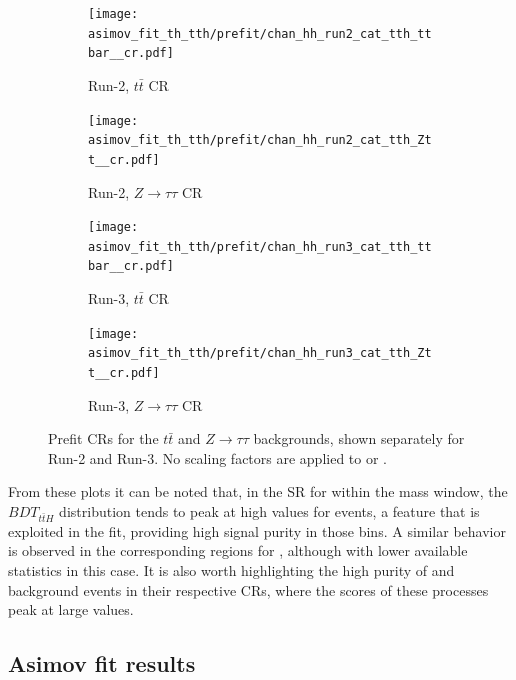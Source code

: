 \begin{figure}[htbp]
  \centering
  \begin{subfigure}[t]{0.45\textwidth}
    \centering
    \texttt{[image: asimov\_fit\_th\_tth/prefit/chan\_hh\_run2\_cat\_tth\_ttbar\_\_cr.pdf]}
    \caption{Run-2, $t\bar{t}$ CR}
  \end{subfigure}
  \hfill
  \begin{subfigure}[t]{0.45\textwidth}
    \centering
    \texttt{[image: asimov\_fit\_th\_tth/prefit/chan\_hh\_run2\_cat\_tth\_Ztt\_\_cr.pdf]}
    \caption{Run-2, $Z\to\tau\tau$ CR}
  \end{subfigure}

  \vspace{0.4cm}
  \begin{subfigure}[t]{0.45\textwidth}
    \centering
    \texttt{[image: asimov\_fit\_th\_tth/prefit/chan\_hh\_run3\_cat\_tth\_ttbar\_\_cr.pdf]}
    \caption{Run-3, $t\bar{t}$ CR}
  \end{subfigure}
  \hfill
  \begin{subfigure}[t]{0.45\textwidth}
    \centering
    \texttt{[image: asimov\_fit\_th\_tth/prefit/chan\_hh\_run3\_cat\_tth\_Ztt\_\_cr.pdf]}
    \caption{Run-3, $Z\to\tau\tau$ CR}
  \end{subfigure}

  \caption{Prefit CRs for the $t\bar{t}$ and $Z\to\tau\tau$ backgrounds, shown separately for Run-2 and Run-3. No scaling factors are applied to \ztautau or \ttbar.}
  \label{fig:crs}
\end{figure}
From these plots it can be noted that, in the SR for \ttH within the mass window, the $BDT_{t\bar{t}H}$ distribution tends to peak at high values for \ttH events, a feature that is exploited in the fit, providing high signal purity in those bins. A similar behavior is observed in the corresponding regions for \thqb, although with lower available statistics in this case. It is also worth highlighting the high purity of \ttbar and \ztautau background events in their respective CRs, where the scores of these processes peak at large values.

\subsection{Asimov fit results}

